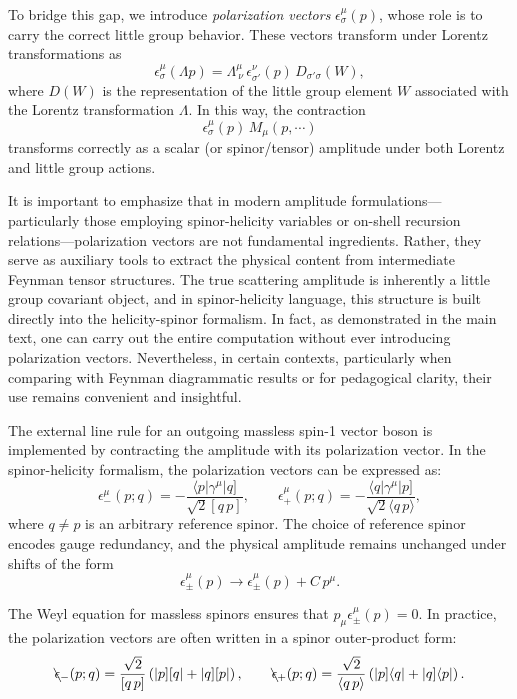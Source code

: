 \documentclass[12pt]{article}
\numberwithin{equation}{section}
\newcommand{\sket}[1]{|#1]}
\newcommand{\bra}[1]{\langle #1|}
\begin{document}
To bridge this gap, we introduce \emph{polarization vectors} \( \epsilon^\mu_\sigma(p) \), whose role is to carry the correct little group behavior. These vectors transform under Lorentz transformations as
\[
\epsilon^\mu_\sigma(\Lambda p) = \Lambda^\mu_{\ \nu} \, \epsilon^\nu_{\sigma'}(p) \, D_{\sigma'\sigma}(W),
\]
where \( D(W) \) is the representation of the little group element \( W \) associated with the Lorentz transformation \( \Lambda \). In this way, the contraction
\[
\epsilon^\mu_\sigma(p) \, M_\mu(p, \cdots)
\]
transforms correctly as a scalar (or spinor/tensor) amplitude under both Lorentz and little group actions.

It is important to emphasize that in modern amplitude formulations—particularly those employing spinor-helicity variables or on-shell recursion relations—polarization vectors are not fundamental ingredients. Rather, they serve as auxiliary tools to extract the physical content from intermediate Feynman tensor structures. The true scattering amplitude is inherently a little group covariant object, and in spinor-helicity language, this structure is built directly into the helicity-spinor formalism.
In fact, as demonstrated in the main text, one can carry out the entire computation without ever introducing polarization vectors. Nevertheless, in certain contexts, particularly when comparing with Feynman diagrammatic results or for pedagogical clarity, their use remains convenient and insightful.

The external line rule for an outgoing massless spin-1 vector boson is implemented by contracting the amplitude with its polarization vector. In the spinor-helicity formalism, the polarization vectors can be expressed as:
\begin{equation}
\epsilon_-^\mu(p; q) = -\frac{\bra{p} \gamma^\mu \sket{q}}{\sqrt{2} [q\,p]}, \qquad
\epsilon_+^\mu(p; q) = -\frac{\bra{q} \gamma^\mu \sket{p}}{\sqrt{2} \langle q\,p \rangle},
\end{equation}
where \( q \neq p \) is an arbitrary reference spinor. The choice of reference spinor encodes gauge redundancy, and the physical amplitude remains unchanged under shifts of the form
\[
\epsilon^\mu_\pm(p) \to \epsilon^\mu_\pm(p) + C\, p^\mu.
\]

The Weyl equation for massless spinors ensures that \( p_\mu \epsilon^\mu_\pm(p) = 0 \). In practice, the polarization vectors are often written in a spinor outer-product form:
\begin{equation}
\bcancel{\epsilon}_-(p; q) = \frac{\sqrt{2}}{[q\,p]}\left( \sket{p}[q| + \sket{q}[p| \right), \qquad
\bcancel{\epsilon}_+(p; q) = \frac{\sqrt{2}}{\langle q\,p \rangle}\left( \sket{p}\bra{q} + \sket{q}\bra{p} \right).
\end{equation}
\end{document}
